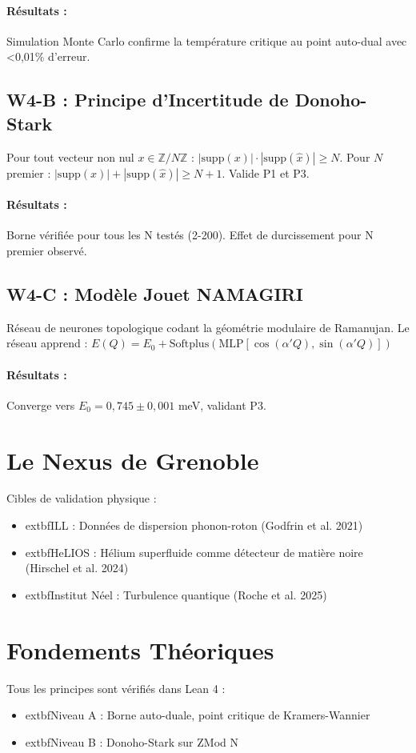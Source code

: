 \documentclass[11pt, twocolumn]{article}
\newcommand{\Pone}{P1\xspace}\newcommand{\Ptwo}{P2\xspace}\newcommand{\Pthree}{P3\xspace}\newcommand{\Pfour}{P4\xspace}
\begin{document}
\paragraph{Résultats :} Simulation Monte Carlo confirme la température critique au point auto-dual avec <0,01\% d'erreur.

\subsection{W4-B : Principe d'Incertitude de Donoho-Stark}
Pour tout vecteur non nul $x \in \mathbb{Z}/N\mathbb{Z}$ : $|\text{supp}(x)|\cdot|\text{supp}(\hat{x})| \geq N$. Pour $N$ premier : $|\text{supp}(x)| + |\text{supp}(\hat{x})| \geq N+1$. Valide \Pone et \Pthree.
\paragraph{Résultats :} Borne vérifiée pour tous les N testés (2-200). Effet de durcissement pour N premier observé.

\subsection{W4-C : Modèle Jouet NAMAGIRI}
Réseau de neurones topologique codant la géométrie modulaire de Ramanujan. Le réseau apprend : $E(Q) = E_0 + \text{Softplus}(\text{MLP}[\cos(\alpha' Q), \sin(\alpha' Q)])$
\paragraph{Résultats :} Converge vers $E_0 = 0,745 \pm 0,001$ meV, validant \Pthree.

\section{Le Nexus de Grenoble}
Cibles de validation physique :
\begin{itemize}
\item 	extbf{ILL} : Données de dispersion phonon-roton (Godfrin et al. 2021)
\item 	extbf{HeLIOS} : Hélium superfluide comme détecteur de matière noire (Hirschel et al. 2024)
\item 	extbf{Institut Néel} : Turbulence quantique (Roche et al. 2025)
\end{itemize}

\section{Fondements Théoriques}
Tous les principes sont vérifiés dans Lean 4 :
\begin{itemize}
\item 	extbf{Niveau A} : Borne auto-duale, point critique de Kramers-Wannier
\item 	extbf{Niveau B} : Donoho-Stark sur ZMod N
\end{itemize}
\end{document}
